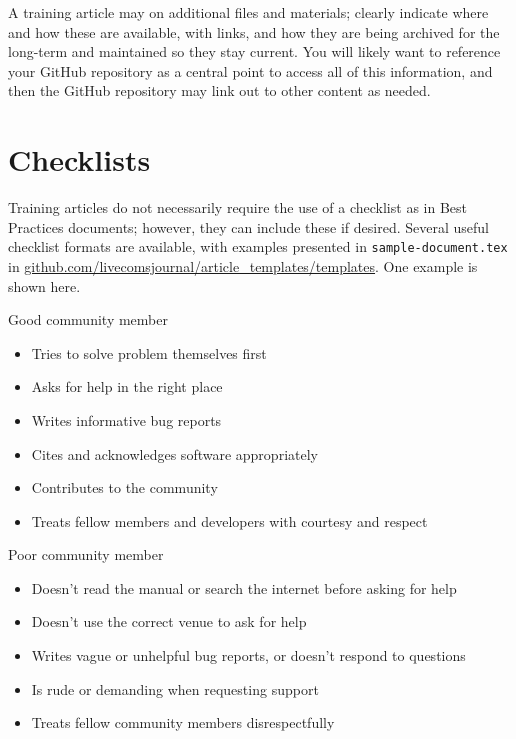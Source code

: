 \documentclass[9pt,training]{livecoms}
\begin{document}
A training article may on additional files and materials; clearly indicate where and how these are available, with links, and how they are being archived for the long-term and maintained so they stay current.
You will likely want to reference your GitHub repository as a central point to access all of this information, and then the GitHub repository may link out to other content as needed.

\section{Checklists}
Training articles do not necessarily require the use of a checklist as in Best Practices documents; however, they can include these if desired.
Several useful checklist formats are available, with examples presented in \texttt{sample-document.tex} in \url{github.com/livecomsjournal/article_templates/templates}.
One example is shown here.

\begin{Checklists}

\begin{checklist}{Good community member}
\begin{itemize}
\item Tries to solve problem themselves first
\item Asks for help in the right place
\item Writes informative bug reports
\item Cites and acknowledges software appropriately
\item Contributes to the community
\item Treats fellow members and developers with courtesy and respect
\end{itemize}
\end{checklist}

\begin{checklist}{Poor community member}
\begin{itemize}
\item Doesn't read the manual or search the internet before asking for help
\item Doesn't use the correct venue to ask for help
\item Writes vague or unhelpful bug reports, or doesn't respond to questions
\item Is rude or demanding when requesting support
\item Treats fellow community members disrespectfully
\end{itemize}
\end{checklist}

\end{Checklists}
\end{document}

